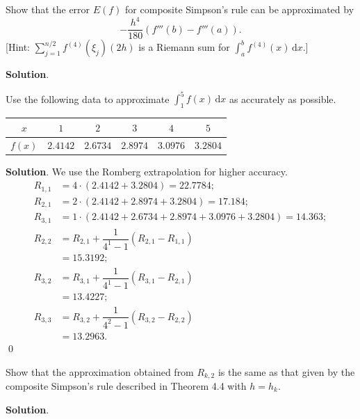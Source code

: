 \documentclass[11pt]{article}
\theoremstyle{break}
\newcommand{\ddi}{\text{$\,$d}}
\numberwithin{equation}{theorem}
\begin{document}
\newpage
\begin{problem}\label{problem 10} %
    Show that the error $E(f)$ for composite Simpson's rule can be approximated by $$-\dfrac{h^4}{180}\left(f'''(b)-f'''(a)\right).$$ [Hint: $\displaystyle\sum_{j=1}^{n/2}f^{(4)}(\xi_j)(2h)$ is a Riemann sum for $\displaystyle\int_{a}^{b}f^{(4)}(x)\ddi x$.]
\end{problem}
\textbf{Solution}. 


\newpage
\begin{problem}\label{problem 11} %
    Use the following data to approximate $\displaystyle\int_1^5 f(x)\ddi x$ as accurately as possible.
    \begin{center}
        \begin{tabular}{c|c|c|c|c|c}
            $x$ & $1$ & $2$ & $3$ & $4$ & $5$ \\
            \hline
            $f(x)$ & $2.4142$ & $2.6734$ & $2.8974$ & $3.0976$ & $3.2804$
        \end{tabular}
    \end{center}
\end{problem}
\textbf{Solution}. We use the Romberg extrapolation for higher accuracy. \begin{align*}
    R_{1,1}&=4\cdot\left(2.4142+3.2804\right)=22.7784;\\
    R_{2,1}&=2\cdot\left(2.4142+2.8974+3.2804\right)=17.184;\\
    R_{3,1}&=1\cdot\left(2.4142+2.6734+2.8974+3.0976+3.2804\right)=14.363;\\
    R_{2,2}&=R_{2,1}+\dfrac{1}{4^1-1}\left(R_{2,1}-R_{1,1}\right)\\
    &=15.3192;\\
    R_{3,2}&=R_{3,1}+\dfrac{1}{4^1-1}\left(R_{3,1}-R_{2,1}\right)\\
    &=13.4227;\\
    R_{3,3}&=R_{3,2}+\dfrac{1}{4^2-1}\left(R_{3,2}-R_{2,2}\right)\\
    &=13.2963.
\end{align*} \qed


\newpage
\begin{problem}\label{problem 12} %
    Show that the approximation obtained from $R_{k,2}$ is the same as that given by the composite Simpson's rule described in Theorem 4.4 with $h=h_k$.
\end{problem}
\textbf{Solution}. 
\end{document}
